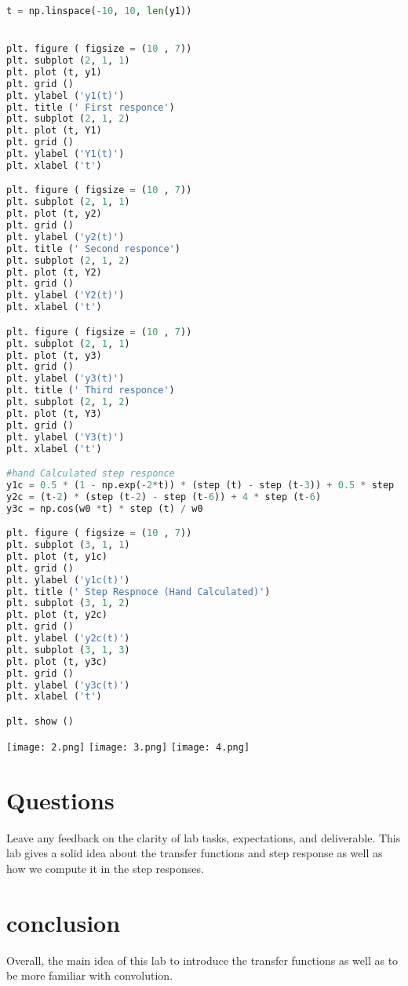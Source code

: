 \documentclass[12pt]{report}
\begin{document}
\begin{lstlisting}[language=Python]
t = np.linspace(-10, 10, len(y1))


plt. figure ( figsize = (10 , 7))
plt. subplot (2, 1, 1)
plt. plot (t, y1)
plt. grid ()
plt. ylabel ('y1(t)')
plt. title (' First responce')
plt. subplot (2, 1, 2)
plt. plot (t, Y1)
plt. grid ()
plt. ylabel ('Y1(t)')
plt. xlabel ('t')

plt. figure ( figsize = (10 , 7))
plt. subplot (2, 1, 1)
plt. plot (t, y2)
plt. grid ()
plt. ylabel ('y2(t)')
plt. title (' Second responce')
plt. subplot (2, 1, 2)
plt. plot (t, Y2)
plt. grid ()
plt. ylabel ('Y2(t)')
plt. xlabel ('t')

plt. figure ( figsize = (10 , 7))
plt. subplot (2, 1, 1)
plt. plot (t, y3)
plt. grid ()
plt. ylabel ('y3(t)')
plt. title (' Third responce')
plt. subplot (2, 1, 2)
plt. plot (t, Y3)
plt. grid ()
plt. ylabel ('Y3(t)')
plt. xlabel ('t')

#hand Calculated step responce
y1c = 0.5 * (1 - np.exp(-2*t)) * (step (t) - step (t-3)) + 0.5 * step (t-3)
y2c = (t-2) * (step (t-2) - step (t-6)) + 4 * step (t-6)
y3c = np.cos(w0 *t) * step (t) / w0

plt. figure ( figsize = (10 , 7))
plt. subplot (3, 1, 1)
plt. plot (t, y1c)
plt. grid ()
plt. ylabel ('y1c(t)')
plt. title (' Step Respnoce (Hand Calculated)')
plt. subplot (3, 1, 2)
plt. plot (t, y2c)
plt. grid ()
plt. ylabel ('y2c(t)')
plt. subplot (3, 1, 3)
plt. plot (t, y3c)
plt. grid ()
plt. ylabel ('y3c(t)')
plt. xlabel ('t')

plt. show ()

\end{lstlisting}

\texttt{[image: 2.png]}
\texttt{[image: 3.png]}
\texttt{[image: 4.png]}


\section{Questions}

Leave any feedback on the clarity of lab tasks, expectations, and deliverable.
This lab gives a solid idea about the transfer functions and step response as well as how we compute it in the step responses.



\section{conclusion}


Overall, the main idea of this lab to introduce the transfer functions as well as to be more familiar with convolution.

\newpage
\end{document}
